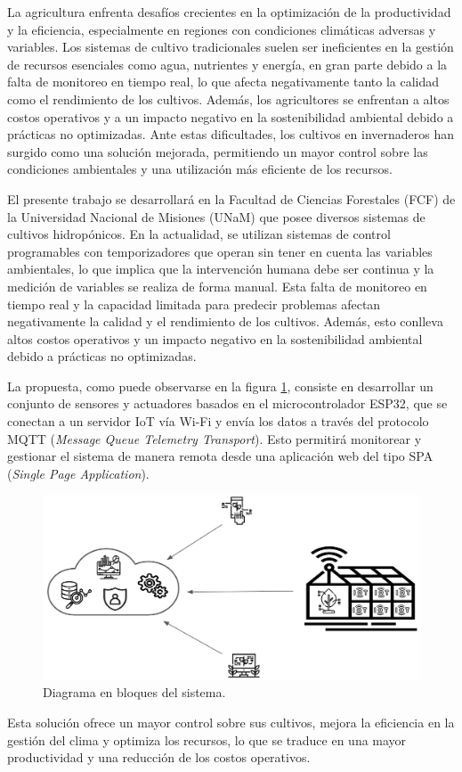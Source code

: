 La agricultura enfrenta desafíos crecientes en la optimización de la
productividad y la eficiencia, especialmente en regiones con condiciones
climáticas adversas y variables. Los sistemas de cultivo tradicionales suelen
ser ineficientes en la gestión de recursos esenciales como agua, nutrientes y
energía, en gran parte debido a la falta de monitoreo en tiempo real, lo que
afecta negativamente tanto la calidad como el rendimiento de los cultivos.
Además, los agricultores se enfrentan a altos costos operativos y a un impacto
negativo en la sostenibilidad ambiental debido a prácticas no optimizadas. Ante
estas dificultades, los cultivos en invernaderos han surgido como una solución
mejorada, permitiendo un mayor control sobre las condiciones ambientales y una
utilización más eficiente de los recursos.

El presente trabajo se desarrollará en la Facultad de Ciencias Forestales 
(FCF) de la Universidad Nacional de Misiones (UNaM) que posee diversos sistemas de cultivos hidropónicos.
En la actualidad, se utilizan sistemas de control programables con temporizadores que 
operan sin tener en cuenta las variables ambientales, lo que implica que la intervención 
humana debe ser continua y la medición de variables se realiza de forma manual. Esta falta 
de monitoreo en tiempo real y la capacidad limitada para predecir problemas afectan negativamente 
la calidad y el rendimiento de los cultivos. Además, esto conlleva altos costos operativos y un 
impacto negativo en la sostenibilidad ambiental debido a prácticas no optimizadas.

La propuesta, como puede observarse en la figura \ref{fig:diagBloques},
consiste en desarrollar un conjunto de sensores y actuadores  basados en el microcontrolador ESP32, 
que se conectan a un servidor IoT vía Wi-Fi y envía los datos a través del protocolo MQTT 
(\textit{Message Queue Telemetry Transport}). Esto permitirá monitorear y gestionar el sistema 
de manera remota desde una aplicación web del tipo SPA (\textit{Single Page Application}).

\begin{figure}[htpb]
	\centering
	\includegraphics[width=.85\textwidth]{./Figuras/figura1.png}
	\caption{Diagrama en bloques del sistema.}
	\label{fig:diagBloques}
\end{figure}

Esta solución ofrece un mayor control sobre sus cultivos, mejora la eficiencia en la gestión del clima y 
optimiza los recursos, lo que se traduce en una mayor productividad y una reducción de los costos operativos.